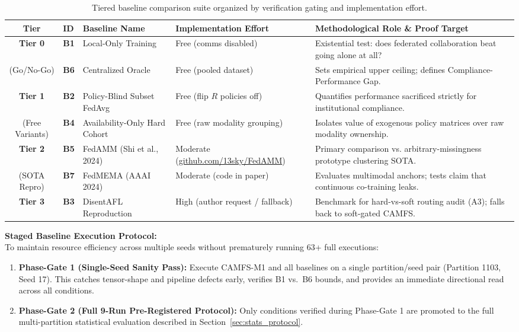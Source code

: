 \documentclass[10pt,a4paper]{article}
\begin{document}
\begin{table}[h]
\centering
\small
\setlength{\tabcolsep}{3.5pt}
\renewcommand{\arraystretch}{1.15}
\begin{tabularx}{\textwidth}{c l l p{3.2cm} X}
\toprule
\textbf{Tier} & \textbf{ID} & \textbf{Baseline Name} & \textbf{Implementation Effort} & \textbf{Methodological Role \& Proof Target} \\
\midrule
\textbf{Tier 0} & \textbf{B1} & Local-Only Training & Free (comms disabled) & Existential test: does federated collaboration beat going alone at all? \\
(Go/No-Go) & \textbf{B6} & Centralized Oracle & Free (pooled dataset) & Sets empirical upper ceiling; defines Compliance-Performance Gap. \\
\midrule
\textbf{Tier 1} & \textbf{B2} & Policy-Blind Subset FedAvg & Free (flip $R$ policies off) & Quantifies performance sacrificed strictly for institutional compliance. \\
(Free Variants) & \textbf{B4} & Availability-Only Hard Cohort & Free (raw modality grouping) & Isolates value of exogenous policy matrices over raw modality ownership. \\
\midrule
\textbf{Tier 2} & \textbf{B5} & FedAMM (Shi et al., 2024) & Moderate (\url{github.com/13sky/FedAMM}) & Primary comparison vs. arbitrary-missingness prototype clustering SOTA. \\
(SOTA Repro) & \textbf{B7} & FedMEMA (AAAI 2024) & Moderate (code in paper) & Evaluates multimodal anchors; tests claim that continuous co-training leaks. \\
\midrule
\textbf{Tier 3} & \textbf{B3} & DisentAFL Reproduction & High (author request / fallback) & Benchmark for hard-vs-soft routing audit (A3); falls back to soft-gated CAMFS. \\
\bottomrule
\end{tabularx}
\caption{Tiered baseline comparison suite organized by verification gating and implementation effort.}
\label{tab:baselines}
\end{table}

\noindent \textbf{Staged Baseline Execution Protocol:}\\
To maintain resource efficiency across multiple seeds without prematurely running 63+ full executions:
\begin{enumerate}[itemsep=1pt, topsep=1pt]
    \item \textbf{Phase-Gate 1 (Single-Seed Sanity Pass):} Execute CAMFS-M1 and all baselines on a single partition/seed pair (Partition 1103, Seed 17). This catches tensor-shape and pipeline defects early, verifies B1 vs.\ B6 bounds, and provides an immediate directional read across all conditions.
    \item \textbf{Phase-Gate 2 (Full 9-Run Pre-Registered Protocol):} Only conditions verified during Phase-Gate 1 are promoted to the full multi-partition statistical evaluation described in Section~\ref{sec:stats_protocol}.
\end{enumerate}
\end{document}
